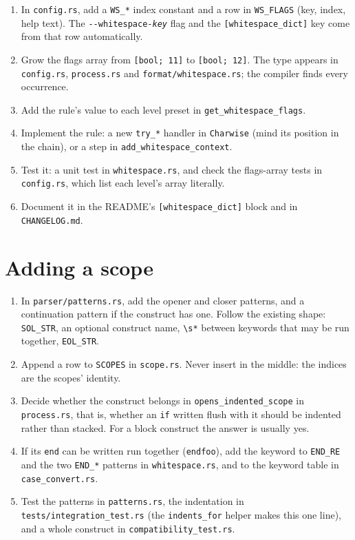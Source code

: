 \documentclass[11pt,a4paper,openany]{book}
\newcommand{\code}[1]{\texttt{\small #1}}
\newcommand{\file}[1]{\texttt{\small\color{accent}#1}}
\newcommand{\flag}[1]{\texttt{\small -{}-#1}}
\begin{document}
\begin{enumerate}
  \item In \file{config.rs}, add a \code{WS\_*} index constant and a row in
    \code{WS\_FLAGS} (key, index, help text). The \flag{whitespace-\textit{key}}
    flag and the \code{[whitespace\_dict]} key come from that row
    automatically.
  \item Grow the flags array from \code{[bool; 11]} to \code{[bool; 12]}.
    The type appears in \file{config.rs}, \file{process.rs} and
    \file{format/whitespace.rs}; the compiler finds every occurrence.
  \item Add the rule's value to each level preset in
    \code{get\_whitespace\_flags}.
  \item Implement the rule: a new \code{try\_*} handler in \code{Charwise}
    (mind its position in the chain), or a step in
    \code{add\_whitespace\_context}.
  \item Test it: a unit test in \file{whitespace.rs}, and check the flags-array
    tests in \file{config.rs}, which list each level's array literally.
  \item Document it in the README's \code{[whitespace\_dict]} block and in
    \file{CHANGELOG.md}.
\end{enumerate}

\section{Adding a scope}

\begin{enumerate}
  \item In \file{parser/patterns.rs}, add the opener and closer patterns, and a
    continuation pattern if the construct has one. Follow the existing shape:
    \code{SOL\_STR}, an optional construct name, \code{\textbackslash s*}
    between keywords that may be run together, \code{EOL\_STR}.
  \item Append a row to \code{SCOPES} in \file{scope.rs}. Never insert in the
    middle: the indices are the scopes' identity.
  \item Decide whether the construct belongs in \code{opens\_indented\_scope}
    in \file{process.rs}, that is, whether an \code{if} written flush with it
    should be indented rather than stacked. For a block construct the answer is
    usually yes.
  \item If its \code{end} can be written run together (\code{endfoo}), add the
    keyword to \code{END\_RE} and the two \code{END\_*} patterns in
    \file{whitespace.rs}, and to the keyword table in \file{case\_convert.rs}.
  \item Test the patterns in \file{patterns.rs}, the indentation in
    \file{tests/integration\_test.rs} (the \code{indents\_for} helper makes
    this one line), and a whole construct in \file{compatibility\_test.rs}.
\end{enumerate}
\end{document}
